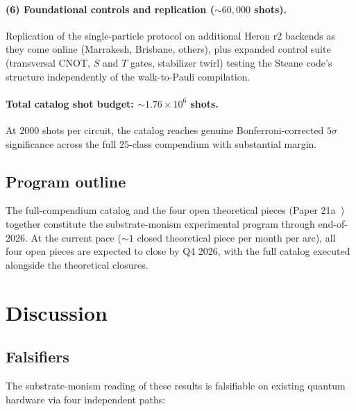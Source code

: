 \documentclass[11pt]{article}
\begin{document}
\paragraph{(6) Foundational controls and replication ($\sim 60{,}000$ shots).}
Replication of the single-particle protocol on additional Heron r2 backends as they come online (Marrakesh, Brisbane, others), plus expanded control suite (transversal CNOT, $S$ and $T$ gates, stabilizer twirl) testing the Steane code's structure independently of the walk-to-Pauli compilation.

\paragraph{Total catalog shot budget: $\sim 1.76 \times 10^6$ shots.}  At $2000$ shots per circuit, the catalog reaches genuine Bonferroni-corrected $5\sigma$ significance across the full $25$-class compendium with substantial margin.

\subsection{Program outline}
\label{sec:programme}

The full-compendium catalog and the four open theoretical pieces (Paper 21a~\cite[\S 9.3]{Paper21a}) together constitute the substrate-monism experimental program through end-of-2026.  At the current pace ($\sim 1$ closed theoretical piece per month per arc), all four open pieces are expected to close by Q4 2026, with the full catalog executed alongside the theoretical closures.

\section{Discussion}
\label{sec:discussion}

\subsection{Falsifiers}
\label{sec:falsifiers}

The substrate-monism reading of these results is falsifiable on existing quantum hardware via four independent paths:
\end{document}
